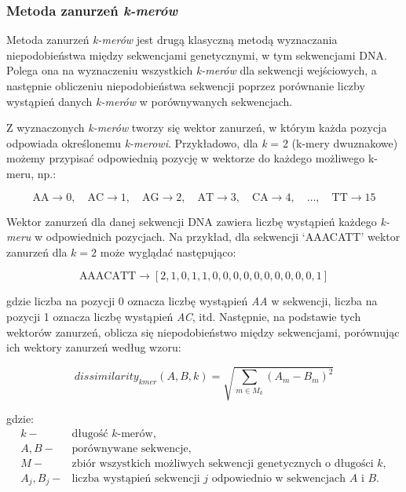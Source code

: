         \subsubsection{Metoda zanurzeń \textit{k-merów}}
            Metoda zanurzeń \textit{k-merów} jest drugą klasyczną metodą wyznaczania niepodobieństwa między sekwencjami genetycznymi, w tym sekwencjami DNA. Polega ona na wyznaczeniu wszystkich \textit{k-merów} dla sekwencji wejściowych, a następnie obliczeniu niepodobieństwa sekwencji poprzez porównanie liczby wystąpień danych \textit{k-merów} w porównywanych sekwencjach.

            Z wyznaczonych \textit{k-merów} tworzy się wektor zanurzeń, w którym każda pozycja odpowiada określonemu \textit{k-merowi}. Przykładowo, dla \textit{k} = 2 (k-mery dwuznakowe) możemy przypisać odpowiednią pozycję w wektorze do każdego możliwego k-meru, np.:

            \[
                \text{AA} \to 0, \quad \text{AC} \to 1, \quad \text{AG} \to 2, \quad \text{AT} \to 3, \quad \text{CA} \to 4, \quad \dots, \quad \text{TT} \to 15
            \]

            Wektor zanurzeń dla danej sekwencji DNA zawiera liczbę wystąpień każdego \textit{k-meru} w odpowiednich pozycjach. Na przykład, dla sekwencji `AAACATT' wektor zanurzeń dla $k=2$ może wyglądać następująco:

            \[
                \text{AAACATT} \to [2, 1, 0, 1, 1, 0, 0, 0, 0, 0, 0, 0, 0, 0, 0, 1]
            \]

            gdzie liczba na pozycji 0 oznacza liczbę wystąpień \textit{AA} w sekwencji, liczba na pozycji 1 oznacza liczbę wystąpień \textit{AC}, itd. Następnie, na podstawie tych wektorów zanurzeń, oblicza się niepodobieństwo między sekwencjami, porównując ich wektory zanurzeń według wzoru:

            \begin{equation}
                dissimilarity_{kmer}(A, B, k) = \sqrt{\sum_{m \in M_{k}} (A_m - B_m)^{2}}
            \end{equation}

            gdzie:
            \begin{align*}
                k -& \text{długość $k$-merów}, \\
                A, B -& \text{porównywane sekwencje}, \\
                M -& \text{zbiór wszystkich możliwych sekwencji genetycznych o długości $k$}, \\
                A_j, B_j -& \text{liczba wystąpień sekwencji } j \text{ odpowiednio w sekwencjach } A \text{ i } B. \\
            \end{align*}

